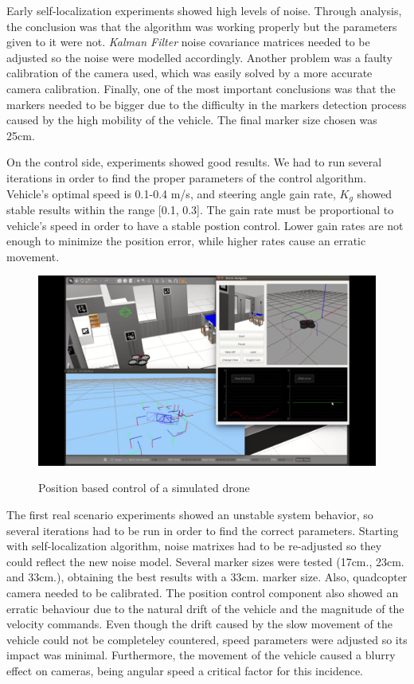 \documentclass{styles/svproc}
\begin{document}
	Early self-localization experiments showed high levels of noise. Through analysis, the conclusion was that the algorithm was working properly but the parameters given to it were not. \textit{Kalman Filter} noise covariance matrices needed to be adjusted so the noise were modelled accordingly. Another problem was a faulty calibration of the camera used, which was easily solved by a more accurate camera calibration. Finally, one of the most important conclusions was that the markers needed to be bigger due to the difficulty in the markers detection process caused by the high mobility of the vehicle. The final marker size chosen was 25cm.
	
	On the control side, experiments showed good results. We had to run several iterations in order to find the proper parameters of the control algorithm. Vehicle's optimal speed is 0.1-0.4 m/s, and steering angle gain rate, $ K_{g}$ showed stable results within the range [0.1, 0.3]. The gain rate must be proportional to vehicle's speed in order to have a stable postion control. Lower gain rates are not enough to minimize the position error, while higher rates cause an erratic movement.
	
	\begin{figure}[h]
		\begin{center}
                {\includegraphics[width=12cm]{simnavigation.png}}
		\end{center}
                \label{fig:simnavigation}
		\caption{Position based control of a simulated drone}
	\end{figure}

	The first real scenario experiments showed an unstable system behavior, so several iterations had to be run in order to find the correct parameters. Starting with self-localization algorithm, noise matrixes had to be re-adjusted so they could reflect the new noise model. Several marker sizes were tested (17cm., 23cm.  and 33cm.), obtaining the best results with a 33cm. marker size. Also, quadcopter camera needed to be calibrated. The position control component also showed an erratic behaviour due to the natural drift of the vehicle and the magnitude of the velocity commands. Even though the drift caused by the slow movement of the vehicle could not be completeley countered, speed parameters were adjusted so its impact was minimal. Furthermore, the movement of the vehicle caused a blurry effect on cameras, being angular speed a critical factor for this incidence.
	
\end{document}
